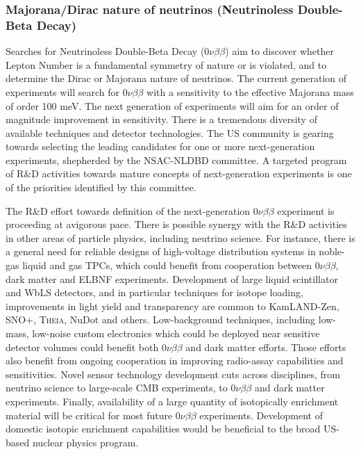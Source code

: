 \subsubsection{Majorana/Dirac nature of neutrinos (Neutrinoless
  Double-Beta Decay)}

Searches for Neutrinoless Double-Beta Decay
($0\nu\beta\beta$) aim to discover whether Lepton Number is a
fundamental symmetry of nature or is violated, and to determine the Dirac or
Majorana nature of neutrinos. The current generation of experiments
will search for $0\nu\beta\beta$  with a sensitivity to the effective Majorana
mass of order 100 meV. The next generation of experiments will aim for
an order of magnitude improvement in sensitivity. There is a
tremendous diversity of available techniques and detector
technologies. The US community is gearing towards selecting the
leading candidates for one or more next-generation experiments,
shepherded by the NSAC-NLDBD committee. A targeted program of R\&D
activities towards mature concepts of next-generation experiments
is one of the priorities identified by this committee. 

The R\&D effort towards definition of the next-generation
$0\nu\beta\beta$ experiment is proceeding at avigorous pace. There is
possible synergy with the R\&D activities in other areas of particle
physics, including neutrino science. For instance, there is a general
need for reliable designs of high-voltage distribution systems in
noble-gas liquid and gas TPCs, which could benefit from cooperation
between $0\nu\beta\beta$, dark matter and ELBNF
experiments. Development of large liquid scintillator and WbLS
detectors, and in particular techniques for isotope loading,
improvements in light yield and transparency are common to
KamLAND-Zen, SNO+, \textsc{Theia}, NuDot and others. Low-background techniques,
including low-mass, low-noise custom electronics which could be
deployed near sensitive detector volumes could benefit both
$0\nu\beta\beta$ and dark matter efforts. Those efforts also benefit
from ongoing cooperation in improving radio-assay capabilities and
sensitivities. Novel sensor technology development cuts across
disciplines, from neutrino science to large-scale CMB experiments, to
$0\nu\beta\beta$ and dark matter experiments. Finally, availability of
a large quantity of isotopically enrichment material will be critical
for most future $0\nu\beta\beta$ experiments. Development of 
domestic isotopic enrichment capabilities would be beneficial to the
broad US-based nuclear physics program.
